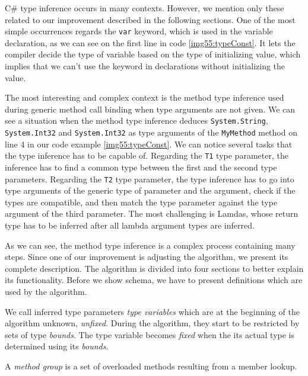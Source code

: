 C\# type inference occurs in many contexts. 
However, we mention only these related to our improvement described in the following sections. 
One of the most simple occurrences regards the \texttt{var} keyword, which is used in the variable declaration, as we can see on the first line in code \ref{img55:typeConst}. It lets the compiler decide the type of variable based on the type of initializing value, which implies that we can’t use the keyword in declarations without initializing the value.
\par
The most interesting and complex context is the method type inference used during generic method call binding when type arguments are not given. 
We can see a situation when the method type inference deduces \texttt{System.String}, \texttt{System.Int32} and \texttt{System.Int32} as type arguments of the \texttt{MyMethod} method on line 4 in our code example \ref{img55:typeConst}. 
We can notice several tasks that the type inference has to be capable of.
Regarding the \texttt{T1} type parameter, the inference has to find a common type between the first and the second type parameters. 
Regarding the \texttt{T2} type parameter, the type inference has to go into type arguments of the generic type of parameter and the argument, check if the types are compatible, and then match the type parameter against the type argument of the third parameter. 
The most challenging is Lamdas, whose return type has to be inferred after all lambda argument types are inferred.
\par
As we can see, the method type inference is a complex process containing many steps.
Since one of our improvement is adjusting the algorithm, we present its complete description.
The algorithm is divided into four sections to better explain its functionality.
Before we show schema, we have to present definitions which are used by the algorithm.
\par
{}
\begin{defn}
We call inferred type parameters \emph{type variables} which are at the beginning of the algorithm unknown, \emph{unfixed}. 
During the algorithm, they start to be restricted by sets of type \emph{bounds}.
The type variable becomes \emph{fixed} when the its actual type is determined using its \emph{bounds}.
\end{defn}
\begin{defn}
A \emph{method group} is a set of overloaded methods resulting from a member lookup.
\end{defn}
